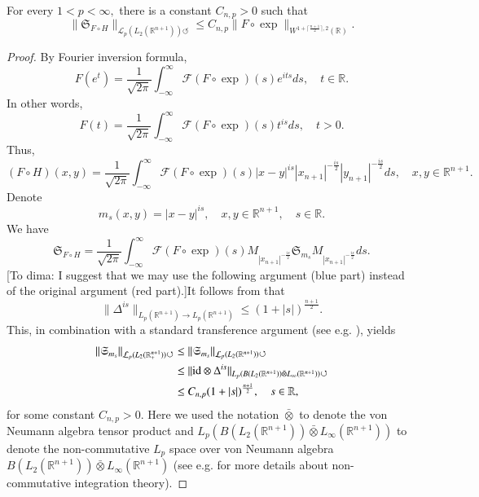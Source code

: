 \documentclass[12pt]{amsart}
\begin{document}
\begin{lemma}\label{post-denis lemma} For every $1<p<\infty,$ there is a constant $C_{n,p}>0$ such that
$$\|\mathfrak{S}_{F\circ H}\|_{\mathcal{L}_p(L_2(\mathbb{R}^{n+1}))\circlearrowleft}\leq C_{n,p}\|F\circ\exp\|_{W^{1+\lceil\frac{n+1}{2}\rceil,2}(\mathbb{R})}.$$
\end{lemma}
\begin{proof} By Fourier inversion formula,
$$F(e^t)=\frac1{\sqrt{2\pi}}\int_{-\infty}^{\infty}\mathcal{F}(F\circ\exp)(s)e^{its}ds,\quad t\in\mathbb{R}.$$
In other words,
$$F(t)=\frac1{\sqrt{2\pi}}\int_{-\infty}^{\infty}\mathcal{F}(F\circ\exp)(s)t^{is}ds,\quad t>0.$$
Thus,
$$(F\circ H)(x,y)=\frac1{\sqrt{2\pi}}\int_{-\infty}^{\infty}\mathcal{F}(F\circ\exp)(s)|x-y|^{is}|x_{n+1}|^{-\frac{is}{2}}|y_{n+1}|^{-\frac{is}{2}}ds,\quad x,y\in\mathbb{R}^{n+1}.$$
Denote
$$m_s(x,y)=|x-y|^{is},\quad x,y\in\mathbb{R}^{n+1},\quad s\in\mathbb{R}.$$
We have
$$\mathfrak{S}_{F\circ H}=\frac1{\sqrt{2\pi}}\int_{-\infty}^{\infty}\mathcal{F}(F\circ\exp)(s)M_{|x_{n+1}|^{-\frac{is}{2}}}\mathfrak{S}_{m_s}M_{|x_{n+1}|^{-\frac{is}{2}}}ds.$$
{\color{brown}[To dima: I suggest that we may use the following argument (blue part) instead of the original argument (red part).]}{\color{blue}It follows from \cite[Theorem 1]{MR1814106} that
$$\|\Delta^{is}\|_{L_{p}(\mathbb{R}^{n+1})\rightarrow L_{p}(\mathbb{R}^{n+1})}\leq (1+|s|)^{\frac{n+1}{2}}.$$
This, in combination with a standard transference argument (see e.g.  \cite{MR3378821,MR2866074}), yields
\begin{align}
\|\mathfrak{S}_{m_s}\|_{\mathcal{L}_p(L_2(\mathbb{R}_+^{n+1}))\circlearrowleft}&\leq \|\mathfrak{S}_{m_s}\|_{\mathcal{L}_p(L_2(\mathbb{R}^{n+1}))\circlearrowleft} \nonumber\\
&\leq\|{\rm id}\otimes \Delta^{is}\|_{L_p(B(L_2(\mathbb{R}^{n+1}))\bar{\otimes}L_{\infty}(\mathbb{R}^{n+1}))\circlearrowleft}\nonumber\\
&\leq C_{n,p}(1+|s|)^{\frac{n+1}{2}},\quad s\in\mathbb{R},
\end{align}
for some constant $C_{n,p}>0$. Here we used the notation $\bar{\otimes}$ to denote the von Neumann algebra tensor product and $L_p(B(L_2(\mathbb{R}^{n+1}))\bar{\otimes}L_{\infty}(\mathbb{R}^{n+1}))$ to denote the non-commutative $L_p$ space over von Neumann algebra $B(L_2(\mathbb{R}^{n+1}))\bar{\otimes}L_{\infty}(\mathbb{R}^{n+1})$ (see e.g. \cite{PX} for more details about non-commutative integration theory).}


\end{proof}
\end{document}
